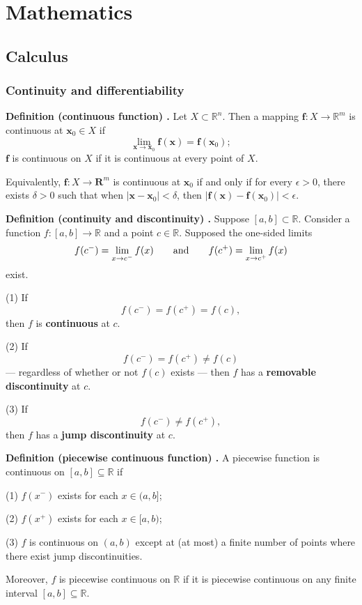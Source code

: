 \chapter{Mathematics}
\section{Calculus}

\subsection{Continuity and differentiability}

\begin{shaded}
\textbf{Definition (continuous function) \cite{hubbard_hubbard}.} Let $X \subset \mathbb{R}^n$. Then a mapping $\mathbf{f} : X \to \mathbb{R}^m$ is continuous at $\mathbf{x}_0 \in X$ if
$$ \lim_{\mathbf{x} \to \mathbf{x}_0} \mathbf{f}(\mathbf{x}) = \mathbf{f}(\mathbf{x}_0); $$
$\mathbf{f}$ is continuous on $X$ if it is continuous at every point of $X$.

Equivalently, $\mathbf{f}: X \to \mathbf{R}^m$ is continuous at $\mathbf{x}_0$ if and only if for every $\epsilon > 0$, there exists $\delta > 0$ such that when $|\mathbf{x} - \mathbf{x}_0| < \delta$, then $|\mathbf{f}(\mathbf{x}) - \mathbf{f}(\mathbf{x}_0)| < \epsilon$.
\end{shaded}

\begin{shaded}
\textbf{Definition (continuity and discontinuity) \cite{math2111_notes}.} Suppose $[a, b] \subset \mathbb{R}$. Consider a function $f : [a, b] \to \mathbb{R}$ and a point $c \in \mathbb{R}$. Supposed the one-sided limits
$$ f(c^-) = \lim_{x \to c^-} f(x) \qquad \textnormal{and} \qquad f(c^+) = \lim_{x \to c^+} f(x) $$
exist.

(1) If
$$ f(c^-) = f(c^+) = f(c) , $$
then $f$ is \textbf{continuous} at $c$.

(2) If
$$ f(c^-) = f(c^+) \not= f(c) $$
--- regardless of whether or not $f(c)$ exists --- then $f$ has a \textbf{removable discontinuity} at $c$.

(3) If
$$ f(c^-) \not= f(c^+) , $$
then $f$ has a \textbf{jump discontinuity} at $c$.
\end{shaded}

\begin{shaded}
\textbf{Definition (piecewise continuous function) \cite{math2111_notes}.} A piecewise function is continuous on $[a, b] \subseteq \mathbb{R}$ if

(1) $f(x^-)$ exists for each $x \in (a, b]$;

(2) $f(x^+)$ exists for each $x \in [a, b)$;

(3) $f$ is continuous on $(a, b)$ except at (at most) a finite number of points where there exist jump discontinuities.

Moreover, $f$ is piecewise continuous on $\mathbb{R}$ if it is piecewise continuous on any finite interval $[a, b] \subseteq \mathbb{R}$.
\end{shaded}

